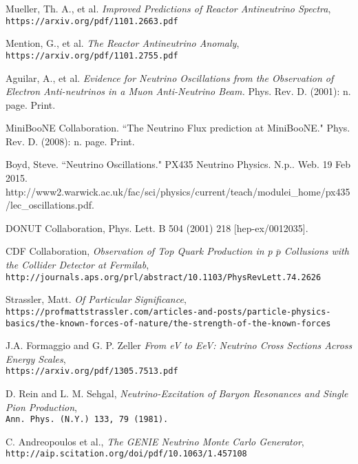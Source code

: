 \begin{thebibliography}{20}
Mueller, Th. A., et al. \emph{Improved Predictions of Reactor Antineutrino Spectra},\\
  \texttt{https://arxiv.org/pdf/1101.2663.pdf}

Mention, G., et al. \emph{The Reactor Antineutrino Anomaly},\\
  \texttt{https://arxiv.org/pdf/1101.2755.pdf}

Aguilar, A., et al. \emph{Evidence for Neutrino Oscillations from the Observation of Electron Anti-neutrinos in a Muon Anti-Neutrino Beam.} Phys. Rev. D. (2001): n. page. Print.

MiniBooNE Collaboration. ``The Neutrino Flux prediction at MiniBooNE." Phys. Rev. D. (2008): n. page. Print.

Boyd, Steve. ``Neutrino Oscillations." PX435 Neutrino Physics. N.p.. Web. 19 Feb 2015. http://www2.warwick.ac.uk/fac/sci/physics/current/teach/modulei\_home/px435/lec\_oscillations.pdf.

DONUT Collaboration, Phys. Lett. B 504 (2001) 218 [hep-ex/0012035].

CDF Collaboration, \emph{Observation of Top Quark Production in p $\overline{p}$ Collusions with the Collider Detector at Fermilab},\\
  \texttt{http://journals.aps.org/prl/abstract/10.1103/PhysRevLett.74.2626}


Strassler, Matt. \emph{Of Particular Significance},\\
  \texttt{https://profmattstrassler.com/articles-and-posts/particle-physics-basics/the-known-forces-of-nature/the-strength-of-the-known-forces}

J.A. Formaggio and G. P. Zeller \emph{From eV to EeV: Neutrino Cross Sections Across Energy Scales},\\
\texttt{https://arxiv.org/pdf/1305.7513.pdf}

D. Rein and L. M. Sehgal, \emph{Neutrino-Excitation of Baryon Resonances and Single Pion Production},\\
\texttt{Ann. Phys. (N.Y.) 133, 79 (1981).}


  C. Andreopoulos et al., \emph{The GENIE Neutrino Monte Carlo Generator}, \\
  \texttt{http://aip.scitation.org/doi/pdf/10.1063/1.457108}



\end{thebibliography}
